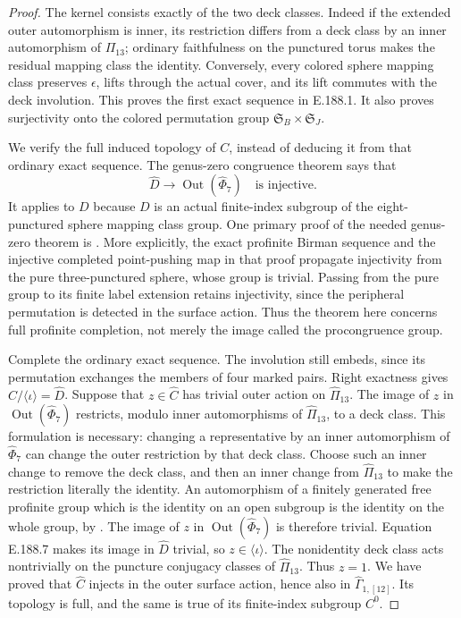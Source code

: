 \begin{proof}
The kernel consists exactly of the two deck classes.
Indeed if the extended outer automorphism is inner,
its restriction differs from a deck class by an inner
automorphism of \(\Pi_{13}\); ordinary faithfulness on
the punctured torus makes the residual mapping class
the identity.  Conversely, every colored sphere mapping
class preserves \(\epsilon\), lifts through the actual
cover, and its lift commutes with the deck involution.
This proves the first exact sequence in E.188.1.
It also proves surjectivity onto the colored permutation
group \(\mathfrak S_B\times\mathfrak S_J\).

We verify the full induced topology of \(C\), instead of
deducing it from that ordinary exact sequence.
The genus-zero congruence theorem says that
\[
 \widehat D\longrightarrow
          \operatorname{Out}(\widehat\Phi_7)
                          \quad\text{is injective}.
\tag{E.188.7}
\]
It applies to \(D\) because \(D\) is an actual finite-index
subgroup of the eight-punctured sphere mapping class group.
One primary proof of the needed genus-zero theorem is
\citet[\S4, pp.9--10, and Theorem 18, pp.16--18,
in the author version]{LitKent2016}.
More explicitly, the exact profinite Birman sequence and
the injective completed point-pushing map in that proof
propagate injectivity from the pure three-punctured sphere,
whose group is trivial.  Passing from the pure group to
its finite label extension retains injectivity, since the
peripheral permutation is detected in the surface action.
Thus the theorem here concerns full profinite completion,
not merely the image called the procongruence group.

Complete the ordinary exact sequence.  The involution
still embeds, since its permutation exchanges the members
of four marked pairs.  Right exactness gives
\(\widehat C/\langle\iota\rangle=\widehat D\).
Suppose that \(z\in\widehat C\) has trivial outer action
on \(\widehat\Pi_{13}\).  The image of \(z\) in
\(\operatorname{Out}(\widehat\Phi_7)\) restricts, modulo
inner automorphisms of \(\widehat\Pi_{13}\), to a deck
class.  This formulation is necessary: changing a
representative by an inner automorphism of
\(\widehat\Phi_7\) can change the outer restriction by
that deck class.
Choose such an inner change to remove the deck class,
and then an inner change from \(\widehat\Pi_{13}\)
to make the restriction literally the identity.
An automorphism of a finitely generated free profinite
group which is the identity on an open subgroup is the
identity on the whole group, by
\citet[Lemma 2.8, pp.333--334]{LitBuxErshovRapinchuk2011}.
The image of \(z\) in \(\operatorname{Out}(\widehat\Phi_7)\)
is therefore trivial.  Equation E.188.7 makes its image
in \(\widehat D\) trivial, so \(z\in\langle\iota\rangle\).
The nonidentity deck class acts nontrivially on the
puncture conjugacy classes of \(\widehat\Pi_{13}\).
Thus \(z=1\).
We have proved that \(\widehat C\) injects in the outer
surface action, hence also in
\(\widehat\Gamma_{1,[12]}\).  Its topology is full, and
the same is true of its finite-index subgroup \(C^0\).


\end{proof}
